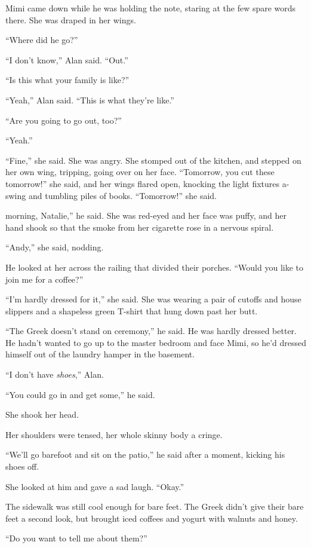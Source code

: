 Mimi came down while he was holding the note, staring at the few spare
words there.  She was draped in her wings.

``Where did he go?''

``I don't know,'' Alan said.  ``Out.''

``Is this what your family is like?''

``Yeah,'' Alan said.  ``This is what they're like.''

``Are you going to go out, too?''

``Yeah.''

``Fine,'' she said.  She was angry.  She stomped out of the kitchen,
and stepped on her own wing, tripping, going over on her face. 
``Tomorrow, you cut these tomorrow!'' she said, and her wings flared
open, knocking the light fixtures a-swing and tumbling piles of books. 
``Tomorrow!'' she said. 

morning, Natalie,'' he said.  She was red-eyed and her face was
puffy, and her hand shook so that the smoke from her cigarette rose in
a nervous spiral.

``Andy,'' she said, nodding. 

He looked at her across the railing that divided their porches. 
``Would you like to join me for a coffee?''

``I'm hardly dressed for it,'' she said.  She was wearing a pair of
cutoffs and house slippers and a shapeless green T-shirt that hung
down past her butt. 

``The Greek doesn't stand on ceremony,'' he said.  He was hardly
dressed better.  He hadn't wanted to go up to the master bedroom and
face Mimi, so he'd dressed himself out of the laundry hamper in the
basement. 

``I don't have \textit{shoes},'' Alan.

``You could go in and get some,'' he said.

She shook her head. 

Her shoulders were tensed, her whole skinny body a cringe.

``We'll go barefoot and sit on the patio,'' he said after a moment,
kicking his shoes off.

She looked at him and gave a sad laugh.  ``Okay.''

The sidewalk was still cool enough for bare feet.  The Greek didn't
give their bare feet a second look, but brought iced coffees and
yogurt with walnuts and honey. 

``Do you want to tell me about them?''

